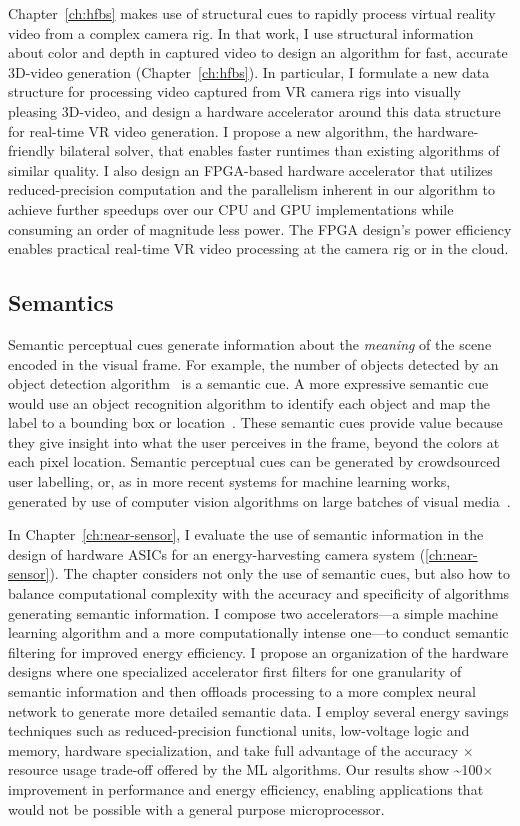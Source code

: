 Chapter~\ref{ch:hfbs} makes use of structural cues to rapidly process virtual reality video from a complex camera rig.
In that work, I use structural information about color and depth in captured video to design an algorithm for fast, accurate 3D-\threesixty video generation (Chapter~\ref{ch:hfbs}).
In particular, I formulate a new data structure for processing video captured from VR camera rigs into visually pleasing 3D-\threesixty video, and design a hardware accelerator around this data structure for real-time VR video generation.
I propose a new algorithm, the hardware-friendly bilateral solver, that enables faster runtimes than existing algorithms of similar quality.
I also design an FPGA-based hardware accelerator that utilizes reduced-precision computation and the parallelism inherent in our algorithm to achieve further speedups over our CPU and GPU implementations while consuming an order of magnitude less power.
The FPGA design's power efficiency enables practical real-time VR video processing at the camera rig or in the cloud.

\subsection{Semantics}
Semantic perceptual cues generate information about the \emph{meaning} of the scene encoded in the visual frame.
For example, the number of objects detected by an object detection algorithm~\cite{vj_journal} is a semantic cue.
A more expressive semantic cue would use an object recognition algorithm to identify each object and map the label to a bounding box or location~\cite{redmon2017yolo}.
These semantic cues provide value because they give insight into what the user perceives in the frame, beyond the colors at each pixel location.
Semantic perceptual cues can be generated by crowdsourced user labelling, or, as in more recent systems for machine learning works, generated by use of computer vision algorithms on large batches of visual media~\cite{poms2018scanner}.

In Chapter~\ref{ch:near-sensor}, I evaluate the use of semantic information in the design of hardware ASICs for an energy-harvesting camera system (\ref{ch:near-sensor}).
The chapter considers not only the use of semantic cues, but also how to balance computational complexity with the accuracy and specificity of algorithms generating semantic information.
I compose two accelerators---a simple machine learning algorithm and a more computationally intense one---to conduct semantic filtering for improved energy efficiency.
I propose an organization of the hardware designs where one specialized accelerator first filters for one granularity of semantic information and then offloads processing to a more complex neural network to generate more detailed semantic data.
I employ several energy savings techniques such as reduced-precision functional units, low-voltage logic and memory, hardware specialization, and take full advantage of the accuracy $\times$ resource usage trade-off offered by the ML algorithms.
Our results show \textasciitilde100$\times$ improvement in performance and energy efficiency, enabling applications that would not be possible with a general purpose microprocessor.

